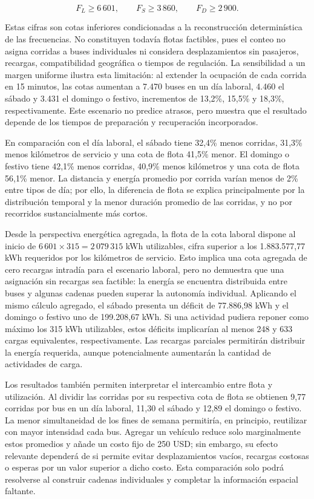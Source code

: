 \begin{equation}
 F_L \geq 6\,601, \qquad
 F_S \geq 3\,860, \qquad
 F_D \geq 2\,900.
 \label{eq:cotas_flota_tipo_dia}
\end{equation}

Estas cifras son cotas inferiores condicionadas a la reconstrucción
determinística de las frecuencias. No constituyen todavía flotas factibles, pues
el conteo no asigna corridas a
buses individuales ni considera desplazamientos sin pasajeros, recargas,
compatibilidad geográfica o tiempos de regulación. La sensibilidad a un margen
uniforme ilustra esta limitación: al extender la ocupación de cada corrida en 15
minutos, las cotas aumentan a 7.470 buses en un día laboral, 4.460 el sábado y
3.431 el domingo o festivo, incrementos de 13,2\%, 15,5\% y 18,3\%,
respectivamente. Este escenario no predice atrasos, pero muestra que el resultado
depende de los tiempos de preparación y recuperación incorporados.

En comparación con el día laboral, el sábado tiene 32,4\% menos corridas, 31,3\%
menos kilómetros de servicio y una cota de flota 41,5\% menor. El domingo o
festivo tiene 42,1\% menos corridas, 40,9\% menos kilómetros y una cota de flota
56,1\% menor. La distancia y energía promedio por corrida varían menos de 2\%
entre tipos de día; por ello, la diferencia de flota se explica principalmente
por la distribución temporal y la menor duración promedio de las corridas, y no
por recorridos sustancialmente más cortos.

Desde la perspectiva energética agregada, la flota de la cota laboral dispone al
inicio de $6\,601\times315=2\,079\,315$ kWh utilizables, cifra superior a los
1.883.577,77 kWh requeridos por los kilómetros de servicio. Esto implica una
cota agregada de cero recargas intradía para el escenario laboral, pero no
demuestra que una asignación sin recargas sea factible: la energía se encuentra
distribuida entre buses y algunas cadenas pueden superar la autonomía individual.
Aplicando el mismo cálculo agregado, el sábado presenta un déficit de 77.886,98
kWh y el domingo o festivo uno de 199.208,67 kWh. Si una actividad pudiera
reponer como máximo los 315 kWh utilizables, estos déficits implicarían al menos
248 y 633 cargas equivalentes, respectivamente. Las recargas parciales permitirán
distribuir la energía requerida, aunque potencialmente aumentarán la cantidad de
actividades de carga.

Los resultados también permiten interpretar el intercambio entre flota y
utilización. Al dividir las corridas por su respectiva cota de flota se obtienen
9,77 corridas por bus en un día laboral, 11,30 el sábado y 12,89 el domingo o
festivo. La menor simultaneidad de los fines de semana permitiría, en principio,
reutilizar con mayor intensidad cada bus. Agregar un vehículo reduce solo
marginalmente estos promedios y añade un costo fijo de 250 USD; sin embargo, su
efecto relevante dependerá de si permite evitar desplazamientos vacíos, recargas
costosas o esperas por un valor superior a dicho costo. Esta comparación solo
podrá resolverse al construir cadenas individuales y completar la información
espacial faltante.

